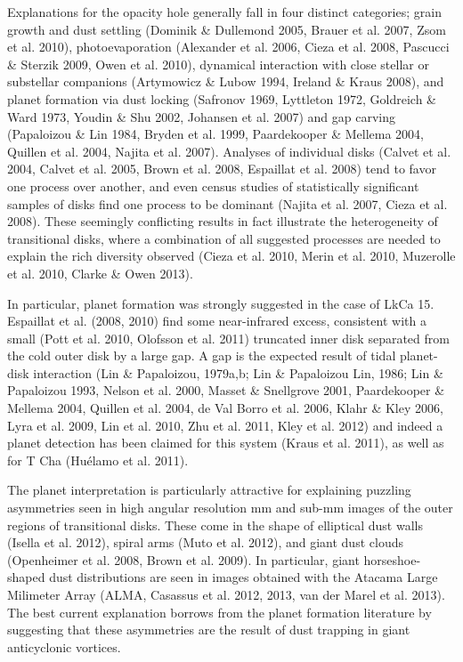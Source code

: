 \documentclass[apj]{emulateapj}
\begin{document}
Explanations for the opacity hole generally fall in four distinct
categories; grain growth and dust settling (Dominik \& Dullemond
2005, Brauer et al. 2007, Zsom et al. 2010), photoevaporation
(Alexander et al. 2006, Cieza et al. 2008, 
Pascucci \& Sterzik 2009, Owen et al. 2010), 
dynamical interaction with close stellar or substellar companions
(Artymowicz \& Lubow 1994, Ireland \& Kraus 2008), and planet
formation via dust locking (Safronov 1969, Lyttleton 1972, Goldreich
\& Ward 1973, Youdin \& Shu 2002, Johansen et al. 2007) and gap
carving (Papaloizou \& Lin 1984, Bryden et al. 1999, Paardekooper \& Mellema 2004,
Quillen et al. 2004, Najita et al. 2007). Analyses of individual disks (Calvet et
al. 2004, Calvet et al. 2005, Brown et al. 2008, Espaillat et
al. 2008) tend to favor one process over another, and even census
studies of statistically significant samples of disks find one process
to be dominant (Najita et al. 2007, Cieza et al. 2008). These
seemingly conflicting results in fact illustrate the
heterogeneity of transitional disks, where a combination of all
suggested processes are needed to explain the rich diversity observed (Cieza et
al. 2010, Merin et al. 2010, Muzerolle et al. 2010, Clarke \& Owen 2013).   

In particular, planet formation was strongly suggested in
the case of LkCa 15. Espaillat et al. (2008, 2010) find some 
near-infrared excess, consistent with a small (Pott et al. 2010,
Olofsson et al. 2011) truncated inner disk separated from the cold
outer disk by a large gap. A gap is the expected result of tidal
planet-disk interaction (Lin \& Papaloizou, 1979a,b; Lin \& Papaloizou
Lin, 1986; Lin \& Papaloizou 1993, Nelson et al. 2000, Masset \&
Snellgrove 2001, Paardekooper \& Mellema 2004, Quillen et
al. 2004, de Val Borro et al. 2006, Klahr \& Kley 2006, Lyra et
al. 2009, Lin et al. 2010, Zhu et al. 2011, Kley et al. 2012) and indeed a planet detection has
been claimed for this system (Kraus et al. 2011), as well as for 
T Cha (Hu\'elamo et al. 2011).

 The planet interpretation is particularly attractive for explaining
puzzling asymmetries seen in high angular resolution  mm and sub-mm 
images of the outer regions of transitional disks. These come in the
shape of elliptical dust walls (Isella et al. 2012), spiral arms
(Muto et al. 2012), and giant dust clouds (Openheimer et al. 2008,
Brown et al. 2009). In particular, giant horseshoe-shaped dust
distributions are seen in images obtained with the Atacama Large
Milimeter Array (ALMA, Casassus et
al. 2012, 2013, van der Marel et al. 2013). The best current
explanation borrows from the planet formation literature by suggesting that these asymmetries are the
result of dust trapping in giant anticyclonic vortices. 
\end{document}
